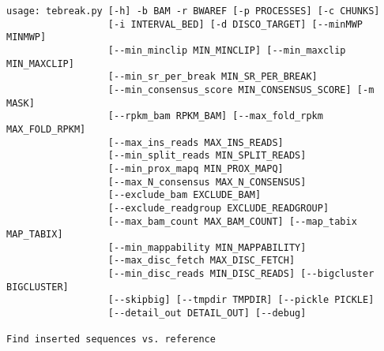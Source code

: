 \documentclass[letterpaper,11pt]{article}
\begin{document}
\begin{verbatim}
usage: tebreak.py [-h] -b BAM -r BWAREF [-p PROCESSES] [-c CHUNKS]
                  [-i INTERVAL_BED] [-d DISCO_TARGET] [--minMWP MINMWP]
                  [--min_minclip MIN_MINCLIP] [--min_maxclip MIN_MAXCLIP]
                  [--min_sr_per_break MIN_SR_PER_BREAK]
                  [--min_consensus_score MIN_CONSENSUS_SCORE] [-m MASK]
                  [--rpkm_bam RPKM_BAM] [--max_fold_rpkm MAX_FOLD_RPKM]
                  [--max_ins_reads MAX_INS_READS]
                  [--min_split_reads MIN_SPLIT_READS]
                  [--min_prox_mapq MIN_PROX_MAPQ]
                  [--max_N_consensus MAX_N_CONSENSUS]
                  [--exclude_bam EXCLUDE_BAM]
                  [--exclude_readgroup EXCLUDE_READGROUP]
                  [--max_bam_count MAX_BAM_COUNT] [--map_tabix MAP_TABIX]
                  [--min_mappability MIN_MAPPABILITY]
                  [--max_disc_fetch MAX_DISC_FETCH]
                  [--min_disc_reads MIN_DISC_READS] [--bigcluster BIGCLUSTER]
                  [--skipbig] [--tmpdir TMPDIR] [--pickle PICKLE]
                  [--detail_out DETAIL_OUT] [--debug]

Find inserted sequences vs. reference


\end{verbatim}
\end{document}
